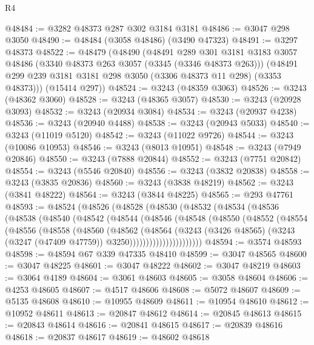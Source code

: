 \begin{lexlean}{R4}
\begin{coremodule}
@48484 := @3282 @48373 @287 @302 @3184 @3181
@48486 := @3047 @298 @3050
@48490 := @48484 (@3058 @48486) (@3490 @47323)
@48491 := @3297 @48373
@48522 := @48479
    (@48490
      (@48491
        @289
        @301
        @3181
        @3183
        @3057
        @48486
        (@3340 @48373 @263 @3057 (@3345 (@3346 @48373 @263)))
        (@48491 @299 @239 @3181 @3181 @298 @3050 (@3306 @48373 @11 @298) (@3353 @48373)))
      (@15414 @297))
@48524 := @3243 (@48359 @3063)
@48526 := @3243 (@48362 @3060)
@48528 := @3243 (@48365 @3057)
@48530 := @3243 (@20928 @3093)
@48532 := @3243 (@20934 @3084)
@48534 := @3243 (@20937 @4238)
@48536 := @3243 (@20940 @4488)
@48538 := @3243 (@20943 @5033)
@48540 := @3243 (@11019 @5120)
@48542 := @3243 (@11022 @9726)
@48544 := @3243 (@10086 @10953)
@48546 := @3243 (@8013 @10951)
@48548 := @3243 (@7949 @20846)
@48550 := @3243 (@7888 @20844)
@48552 := @3243 (@7751 @20842)
@48554 := @3243 (@5546 @20840)
@48556 := @3243 (@3832 @20838)
@48558 := @3243 (@3835 @20836)
@48560 := @3243 (@3838 @48219)
@48562 := @3243 (@3841 @48222)
@48564 := @3243 (@3844 @48225)
@48565 := @293 @47761
@48593 := @48524
    (@48526
      (@48528
        (@48530
          (@48532
            (@48534
              (@48536
                (@48538
                  (@48540
                    (@48542
                      (@48544
                        (@48546
                          (@48548
                            (@48550
                              (@48552
                                (@48554
                                  (@48556
                                    (@48558
                                      (@48560
                                        (@48562
                                          (@48564
                                            (@3243
                                              (@3426 @48565)
                                              (@3243
                                                (@3247 (@47409 @47759))
                                                @3250))))))))))))))))))))))
@48594 := @3574 @48593
@48598 := @48594 @67 @339 @47335 @48410
@48599 := @3047 @48565
@48600 := @3047 @48225
@48601 := @3047 @48222
@48602 := @3047 @48219
@48603 := @3064 @4189
@48604 := @3061 @48603
@48605 := @3058 @48604
@48606 := @4253 @48605
@48607 := @4517 @48606
@48608 := @5072 @48607
@48609 := @5135 @48608
@48610 := @10955 @48609
@48611 := @10954 @48610
@48612 := @10952 @48611
@48613 := @20847 @48612
@48614 := @20845 @48613
@48615 := @20843 @48614
@48616 := @20841 @48615
@48617 := @20839 @48616
@48618 := @20837 @48617
@48619 := @48602 @48618

\end{coremodule}
\end{lexlean}
